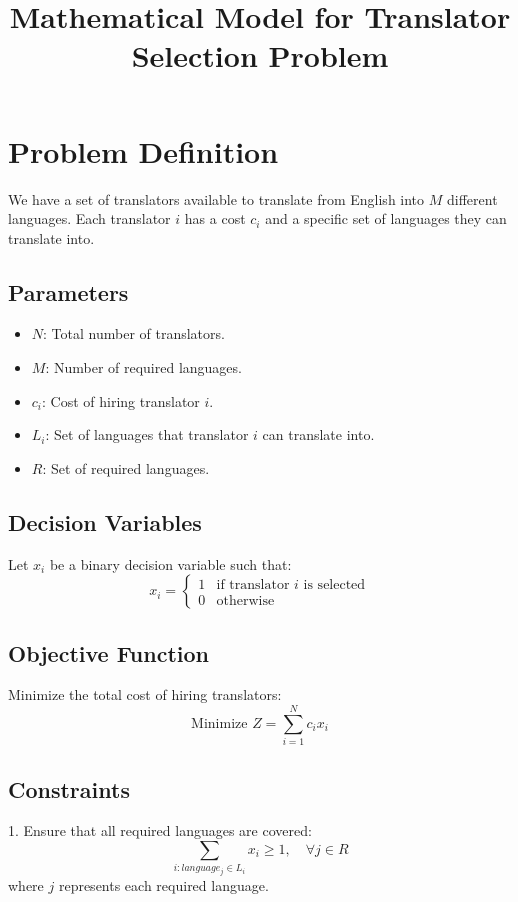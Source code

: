 \documentclass{article}
\begin{document}
\title{Mathematical Model for Translator Selection Problem}
\author{}
\date{}
\maketitle

\section*{Problem Definition}

We have a set of translators available to translate from English into $M$ different languages. Each translator $i$ has a cost $c_i$ and a specific set of languages they can translate into.

\subsection*{Parameters}
\begin{itemize}
    \item $N$: Total number of translators.
    \item $M$: Number of required languages.
    \item $c_i$: Cost of hiring translator $i$.
    \item $L_i$: Set of languages that translator $i$ can translate into.
    \item $R$: Set of required languages.
\end{itemize}

\subsection*{Decision Variables}
Let $x_i$ be a binary decision variable such that:
\[
x_i =
\begin{cases}
1 & \text{if translator } i \text{ is selected} \\
0 & \text{otherwise}
\end{cases}
\]

\subsection*{Objective Function}
Minimize the total cost of hiring translators:
\[
\text{Minimize } Z = \sum_{i=1}^{N} c_i x_i
\]

\subsection*{Constraints}
1. Ensure that all required languages are covered:
\[
\sum_{i: language_j \in L_i} x_i \geq 1, \quad \forall j \in R
\]
where $j$ represents each required language.
\end{document}
